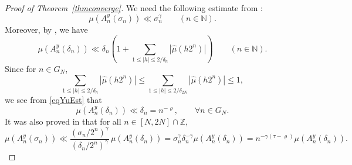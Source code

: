 \documentclass[amssymb,amsfonts,refcheck,12pt,verbatim,righttag]{amsart}
\numberwithin{equation}{section} %
\newcommand{\N}{\mathbb{N}}
\theoremstyle{plain}
\begin{document}
\begin{proof}[Proof of Theorem~\ref{thmconverge}]
We need the following estimate  from \cite[Section 2.1]{ACY24}:
\begin{equation}\label{Ahlforsregular}
\mu (A_{n}^{y}(\sigma_{n}))\ll \sigma_{n}^{\gamma}  \qquad (n\in \N).
\end{equation}
Moreover, by \cite[Theorem 4.1]{Yu21R}, we have
\begin{equation}\label{eqYuEst}
\mu (A_{n}^{y}(\delta_{n}))\ll \delta_{n}\left(1 + \sum_{1\leqslant |h|\leqslant 2 / \delta_{n}}|\widehat{\mu} (h2^{n})|\right)\qquad (n\in \mathbb{N}).
\end{equation}
Since for  $n\in G_N$,
	\[\sum_{1\leq |h|\leq 2/\delta_n}|\widehat{\mu} (h2^{n})|\leq\sum_{1\leq |h|\leq 2/\delta_{2N}}|\widehat{\mu} (h2^{n})|\leq1, \]
we see from \eqref{eqYuEst} that 
\begin{equation}\label{Good}
		\mu (A_{n}^{y}(\delta_{n}))\ll \delta_n=n^{-\varrho}, \qquad \forall n\in G_N.
	\end{equation}
It was also proved in \cite{ABCY23A} that for all $n\in[N,2N]\cap\mathbb{Z}$, 
\begin{equation}\label{eqsigmadeltan}
\mu (A_{n}^{y}(\sigma_{n}))\ll
	\frac{(\sigma_{n} / 2^{n})^{\gamma}}{(\delta_{n} / 2^{n})^{\gamma}}\,
	\mu (A_{n}^{y}(\delta_{n}))=\sigma_{n}^{\gamma}\delta_{n}^{- \gamma}\mu (A_{n}^{y}(\delta_{n}))=n^{-\gamma(\tau-\varrho)}\mu (A_{n}^{y}(\delta_{n})).
\end{equation}



\end{proof}
\end{document}
